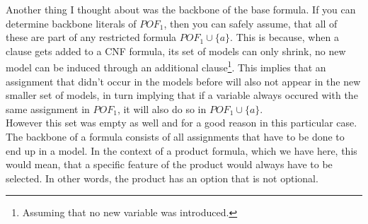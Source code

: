 Another thing I thought about was the backbone of the base formula. If you can determine backbone literals of $POF_1$, then you can safely assume, that all of these are part of any restricted formula $POF_1 \cup \{a\}$. This is because, when a clause gets added to a CNF formula, its set of models can only shrink, no new model can be induced through an additional clause\footnote{Assuming that no new variable was introduced.}. This implies that an assignment that didn't occur in the models before will also not appear in the new smaller set of models, in turn implying that if a variable always occured with the same assignment in $POF_1$, it will also do so in $POF_1 \cup \{a\}$. \\
However this set was empty as well and for a good reason in this particular case. The backbone of a formula consists of all assignments that have to be done to end up in a model. In the context of a product formula, which we have here, this would mean, that a specific feature of the product would always have to be selected. In other words, the product has an option that is not optional. 

\fi